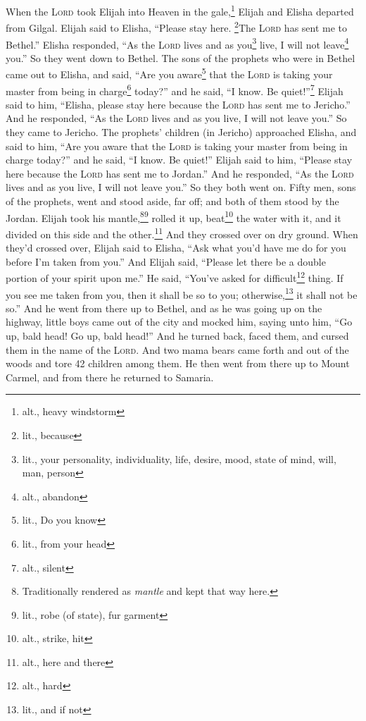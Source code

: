 
\begin{inparaenum}
     When the \textsc{Lord} took Elijah into Heaven in the gale,\footnote{alt., heavy windstorm} Elijah and Elisha departed from Gilgal.%
     Elijah said to Elisha, ``Please stay here. \footnote{lit., because}The \textsc{Lord} has sent me to Bethel.'' Elisha responded, ``As the \textsc{Lord} lives and as you\footnote{lit., your personality, individuality, life, desire, mood, state of mind, will, man, person} live, I will not leave\footnote{alt., abandon} you.'' So they went down to Bethel.%
     The sons of the prophets who were in Bethel came out to Elisha, and said, ``Are you aware\footnote{lit., Do you know} that the \textsc{Lord} is taking your master from being in charge\footnote{lit., from your head} today?'' and he said, ``I know. Be quiet!''\footnote{alt., silent}%
     Elijah said to him, ``Elisha, please stay here because the \textsc{Lord} has sent me to Jericho.'' And he responded, ``As the \textsc{Lord} lives and as you live, I will not leave you.'' So they came to Jericho.%
     The prophets' children (in Jericho) approached Elisha, and said to him, ``Are you aware that the \textsc{Lord} is taking your master from being in charge today?'' and he said, ``I know. Be quiet!''%
     Elijah said to him, ``Please stay here because the \textsc{Lord} has sent me to Jordan.'' And he responded, ``As the \textsc{Lord} lives and as you live, I will not leave you.'' So they both went on.%
     Fifty men, sons of the prophets, went and stood aside, far off; and both of them stood by the Jordan.%
     Elijah took his mantle,\footnote{Traditionally rendered as \textit{mantle} and kept that way here.}\footnote{lit., robe (of state), fur garment} rolled it up, beat\footnote{alt., strike, hit} the water with it, and it divided on this side and the other.\footnote{alt., here and there} And they crossed over on dry ground.%
     When they'd crossed over, Elijah said to Elisha, ``Ask what you'd have me do for you before I'm taken from you.'' And Elijah said, ``Please let there be a double portion of your spirit upon me.''%
     He said, ``You've asked for difficult\footnote{alt., hard} thing. If you see me taken from you, then it shall be so to you; otherwise,\footnote{lit., and if not} it shall not be so.''%
     And he went from there up to Bethel, and as he was going up on the highway, little boys came out of the city and mocked him, saying unto him, ``Go up, bald head! Go up, bald head!''%
     And he turned back, faced them, and cursed them in the name of the \textsc{Lord}. And two mama bears came forth and out of the woods and tore 42 children among them.%
     He then went from there up to Mount Carmel, and from there he returned to Samaria.%
\end{inparaenum}
